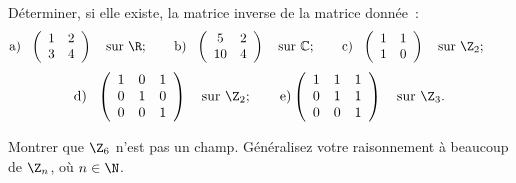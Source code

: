 \documentclass[12pt,french,oneside,a4paper]{memoir} %
\begin{document}
\begin{exo}
Déterminer, si elle existe, la matrice inverse de la matrice donnée~:
\begin{equation*}
\mathrm{a)}~~\left(\begin{array}{cc}
1 & 2\\
3 & 4
\end{array}\right)
\quad \mathrm{sur}~\R;
\qquad%
\mathrm{b)}~~\left(\begin{array}{cc}
5 & 2\\
10 & 4
\end{array}\right)
\quad \mathrm{sur}~\mathbb C;
\qquad%
\mathrm{c)}~~\left(\begin{array}{cc}
1 & 1\\
1 & 0
\end{array}\right)
\quad \mathrm{sur}~\Z_2;
\qquad%
\end{equation*}
\begin{equation*}
\mathrm{d)}~~\left(\begin{array}{ccc}
1 & 0 & 1\\
0 & 1 & 0\\
0 & 0 & 1
\end{array}\right)
\quad \mathrm{sur}~\Z_2;
\qquad%
\mathrm{e)}\left(\begin{array}{ccc}
1 & 1 & 1\\
0 & 1 & 1\\
0 & 0 & 1
\end{array}\right)
\quad \mathrm{sur}~\Z_3.
\end{equation*}
\end{exo}
\begin{exo}
Montrer que $\Z_6$ n'est pas un champ.  Généralisez votre raisonnement à beaucoup de $\Z_n$, où $n \in \N$.
\end{exo}
\end{document}

